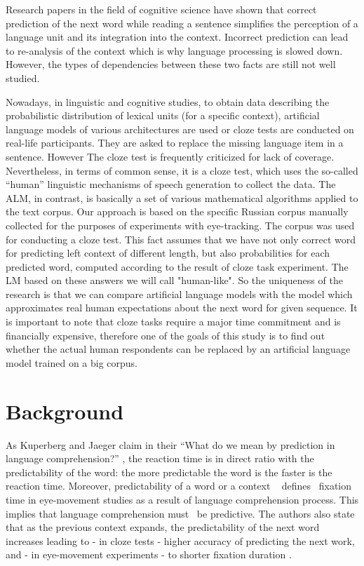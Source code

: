 \documentclass[a4paper]{article}
\begin{document}
Research papers in the field of cognitive science have shown that correct prediction of the next word while reading a sentence simplifies the perception of a language unit and its integration into the context. Incorrect prediction can lead to re-analysis of the context which is why language processing is slowed down. However, the types of dependencies between these two facts are still not well studied.

Nowadays, in linguistic and cognitive studies, to obtain data describing the probabilistic distribution of lexical units (for a specific context), artificial language models of various architectures are used or cloze tests are conducted on real-life participants. They are asked to replace the missing language item in a sentence. However The cloze test is frequently criticized for lack of coverage. Nevertheless, in terms of common sense, it is a cloze test, which uses the so-called “human” linguistic mechanisms of speech generation to collect the data. The ALM, in contrast, is basically a set of various mathematical algorithms applied to the text corpus.
Our approach is based on the specific Russian corpus manually collected for the purposes of experiments with eye-tracking. The corpus was used for conducting a cloze test. This fact assumes that we have not only correct word for predicting left context of different length, but also probabilities for each predicted word, computed according to the result of cloze task experiment. The LM based on these answers we will call "human-like". So the uniqueness of the research is that we can compare artificial language models with the model which approximates real human expectations about the next word for given sequence.
It is important to note that cloze tasks require a major time commitment and is financially expensive, therefore one of the goals of this study is to find out whether the actual human respondents can be replaced by an artificial language model trained on a big corpus.

\section{Background}


As Kuperberg and Jaeger claim in their “What do we mean by prediction
in language comprehension?” \cite{kuperberg-jaeger}, the reaction time is in direct ratio with the predictability of the word: the more predictable the word is the faster is the reaction time. Moreover, predictability of a word or a context
  defines
 fixation time in eye-movement studies as a result of language comprehension process. This implies that language comprehension must
 be predictive. The authors also state that as the previous context expands, the predictability of the next word increases leading to - in cloze tests - higher accuracy of predicting the next work, and - in eye-movement experiments - to shorter fixation duration
. 
\end{document}
